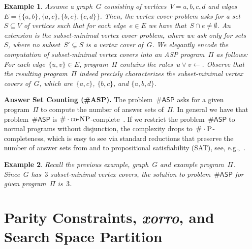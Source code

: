 \documentclass{article}
\newtheorem{example}{Example}
\def\asp{\textsf{\#ASP}\xspace}
\def\SAT{\textsf{SAT}\xspace}
\renewcommand{\P}{\ensuremath{\textsc{P}}\xspace}
\newcommand{\coNP}{\ensuremath{\text{co-}\textsc{NP}}\xspace}
\newcommand{\cnt}[0]{\ensuremath{\#}}
\newcommand{\cntc}[0]{\ensuremath{\cnt\cdot}}
\begin{document}

\begin{example}
Assume a graph~$G$ consisting of vertices~$V=a,b,c,d$
and edges~$E=\{\{a,b\}, \{a,c\}, \{b,c\}, \{c,d\}\}$.
Then, the \emph{vertex cover problem} asks for a set~$S\subseteq V$ of vertices
such that for each edge~$e\in E$ we have that~$S\cap e\neq \emptyset$.
An extension is the \emph{subset-minimal vertex cover problem}, where we ask
only for sets~$S$, where no subset~$S'\subsetneq S$ is a vertex cover of~$G$.
We elegantly encode the computation of subset-minimal vertex covers into an ASP program~$\Pi$ as follows:
For each edge~$\{u,v\}\in E$, program~$\Pi$ contains the rules~$u \vee v \leftarrow$.
Observe that the resulting program~$\Pi$ indeed precisly characterizes the subset-minimal vertex covers of~$G$, which are~$\{a,c\}$, $\{b,c\}$, and $\{a,b,d\}$.
\end{example}

\noindent\textbf{Answer Set Counting (\asp).}
The problem~$\asp$ asks for a given program~$\Pi$ to compute the number of
answer sets of~$\Pi$.
In general we have that problem~$\asp$ is
$\cntc\coNP$-complete~\cite{FichteEtAl17}.
If we restrict the problem~$\asp$ to normal programs without disjunction,
the complexity drops to~$\cntc\P$-completeness,
which is easy to see via standard reductions
that preserve the number of answer sets from and to propositional satisfiability (\SAT), see, e.g.,~\cite{Janhunen06}.

\begin{example}
Recall the previous example, graph~$G$ and example program~$\Pi$.
Since~$G$ has~$3$ subset-minimal vertex covers, the solution to problem~$\asp$
for given program~$\Pi$ is~$3$.
\end{example}


\section{Parity Constraints, \emph{xorro}, and Search Space Partition} \label{sec:parity}
\end{document}
